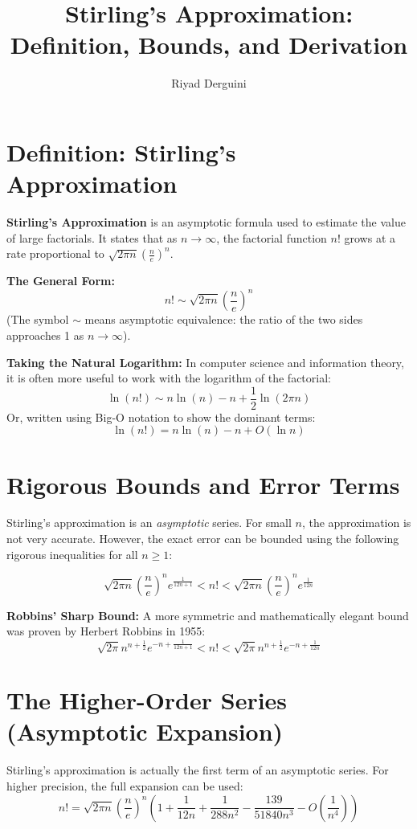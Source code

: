 \documentclass[11pt]{article}
\title{Stirling's Approximation: Definition, Bounds, and Derivation}
\author{Riyad Derguini}
\date{}
\begin{document}
\maketitle

\section{Definition: Stirling's Approximation}

\textbf{Stirling's Approximation} is an asymptotic formula used to estimate the value of large factorials. It states that as \(n \to \infty\), the factorial function \(n!\) grows at a rate proportional to \(\sqrt{2\pi n} \left(\frac{n}{e}\right)^n\).

\textbf{The General Form:}
\[
 n! \sim \sqrt{2\pi n} \left(\frac{n}{e}\right)^n 
\]
(The symbol \(\sim\) means asymptotic equivalence: the ratio of the two sides approaches 1 as \(n \to \infty\)).

\textbf{Taking the Natural Logarithm:}
In computer science and information theory, it is often more useful to work with the logarithm of the factorial:
\[
 \ln(n!) \sim n \ln(n) - n + \frac{1}{2}\ln(2\pi n) 
\]
Or, written using Big-O notation to show the dominant terms:
\[
 \ln(n!) = n \ln(n) - n + O(\ln n) 
\]

\hrulefill

\section{Rigorous Bounds and Error Terms}

Stirling's approximation is an \emph{asymptotic} series. For small \(n\), the approximation is not very accurate. However, the exact error can be bounded using the following rigorous inequalities for all \(n \ge 1\):

\[
 \sqrt{2\pi n} \left(\frac{n}{e}\right)^n e^{\frac{1}{12n+1}} < n! < \sqrt{2\pi n} \left(\frac{n}{e}\right)^n e^{\frac{1}{12n}} 
\]

\textbf{Robbins' Sharp Bound:} A more symmetric and mathematically elegant bound was proven by Herbert Robbins in 1955:
\[
 \sqrt{2\pi} n^{n+\frac{1}{2}} e^{-n+\frac{1}{12n+1}} < n! < \sqrt{2\pi} n^{n+\frac{1}{2}} e^{-n+\frac{1}{12n}} 
\]

\hrulefill

\section{The Higher-Order Series (Asymptotic Expansion)}
Stirling's approximation is actually the first term of an asymptotic series. For higher precision, the full expansion can be used:
\[
 n! = \sqrt{2\pi n} \left(\frac{n}{e}\right)^n \left( 1 + \frac{1}{12n} + \frac{1}{288n^2} - \frac{139}{51840n^3} - O\left(\frac{1}{n^4}\right) \right) 
\]
\end{document}
